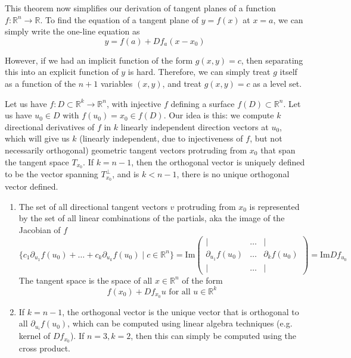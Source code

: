   This theorem now simplifies our derivation of tangent planes of a function $f: \mathbb{R}^n \longrightarrow \mathbb{R}$. To find the equation of a tangent plane of $y = f(x)$ at $x = a$, we can simply write the one-line equation as 
	\begin{equation}
  	y = f(a) + D f_{a} (x - x_0)
	\end{equation}

  However, if we had an implicit function of the form $g(x, y) = c$, then separating this into an explicit function of $y$ is hard. Therefore, we can simply treat $g$ itself as a function of the $n+1$ variables $(x, y)$, and treat $g(x, y) = c$ as a level set. 

  \begin{theorem}
		Let us have $f: D \subset \mathbb{R}^k \longrightarrow \mathbb{R}^n$, with injective $f$ defining a surface $f(D) \subset \mathbb{R}^n$. Let us have $u_0 \in D$ with $f(u_0) = x_0 \in f(D)$. Our idea is this: we compute $k$ directional derivatives of $f$ in $k$ linearly independent direction vectors at $u_0$, which will give us $k$ (linearly independent, due to injectiveness of $f$, but not necessarily orthogonal) geometric tangent vectors protruding from $x_0$ that span the tangent space $T_{x_0}$. If $k = n-1$, then the orthogonal vector is uniquely defined to be the vector spanning $T_{x_0}^\perp$, and is $k < n-1$, there is no unique orthogonal vector defined. 
		\begin{enumerate}
			\item The set of all directional tangent vectors $v$ protruding from $x_0$ is represented by the set of all linear combinations of the partials, aka the image of the Jacobian of $f$
				\begin{equation}
					\{c_1 \partial_{u_1} f (u_0) + \ldots + c_k \partial_{u_k} f (u_0) \mid c \in \mathbb{R}^n\} = \mathrm{Im} \begin{pmatrix} \vert & \ldots & \vert \\ \partial_{u_1} f (u_0) & \ldots & \partial_{k} f (u_0) \\ \vert & \ldots & \vert \end{pmatrix} = \mathrm{Im} D f_{u_0}
				\end{equation}
				The tangent space is the space of all $x \in \mathbb{R}^n$ of the form 
				\begin{equation}
					f(x_0) + D f_{x_0} u \text{ for all } u \in \mathbb{R}^k
				\end{equation}

			\item If $k=n-1$, the orthogonal vector is the unique vector that is orthogonal to all $\partial_{u_i} f(u_0)$, which can be computed using linear algebra techniques (e.g. kernel of $D f_{x_0}$). If $n=3, k=2$, then this can simply be computed using the cross product. 
		\end{enumerate}
  \end{theorem}


